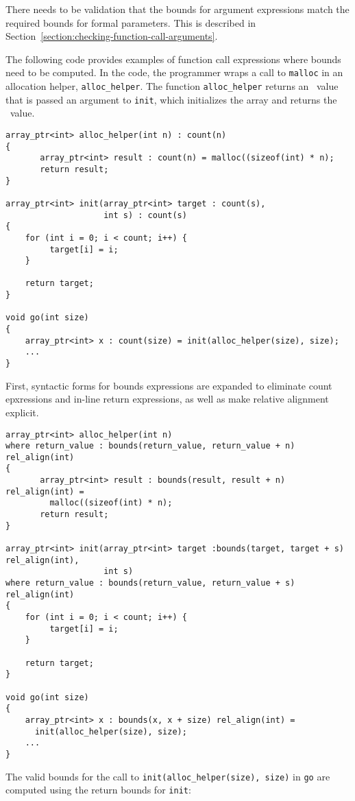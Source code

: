 There needs to be validation that the bounds for argument expressions
match the required bounds for formal parameters. This is described in
Section~\ref{section:checking-function-call-arguments}.

The following code provides examples of function call expressions where
bounds need to be computed. In the code, the programmer wraps a call to
\texttt{malloc} in an allocation helper, \texttt{alloc\_helper}. The
function \texttt{alloc\_helper} returns an \arrayptr\ value
that is passed an argument to \texttt{init}, which initializes the array
and returns the \arrayptr\ value.
\begin{verbatim}
array_ptr<int> alloc_helper(int n) : count(n)
{
       array_ptr<int> result : count(n) = malloc((sizeof(int) * n);
       return result;
}

array_ptr<int> init(array_ptr<int> target : count(s), 
                    int s) : count(s)
{
    for (int i = 0; i < count; i++) {
         target[i] = i;
    }

    return target;
}

void go(int size) 
{
    array_ptr<int> x : count(size) = init(alloc_helper(size), size);
    ...
}
\end{verbatim}

First, syntactic forms for bounds expressions are expanded to eliminate
count epxressions and in-line return expressions, as well as make
relative alignment explicit.

\begin{verbatim}
array_ptr<int> alloc_helper(int n)
where return_value : bounds(return_value, return_value + n) rel_align(int)
{
       array_ptr<int> result : bounds(result, result + n) rel_align(int) =
         malloc((sizeof(int) * n);
       return result;
}

array_ptr<int> init(array_ptr<int> target :bounds(target, target + s) rel_align(int), 
                    int s) 
where return_value : bounds(return_value, return_value + s) rel_align(int)
{
    for (int i = 0; i < count; i++) {
         target[i] = i;
    }

    return target;
}

void go(int size) 
{
    array_ptr<int> x : bounds(x, x + size) rel_align(int) = 
      init(alloc_helper(size), size);
    ...
}
\end{verbatim}

The valid bounds for the call to \texttt{init(alloc\_helper(size),
size)} in \texttt{go} are computed using the return bounds for
\texttt{init}:

